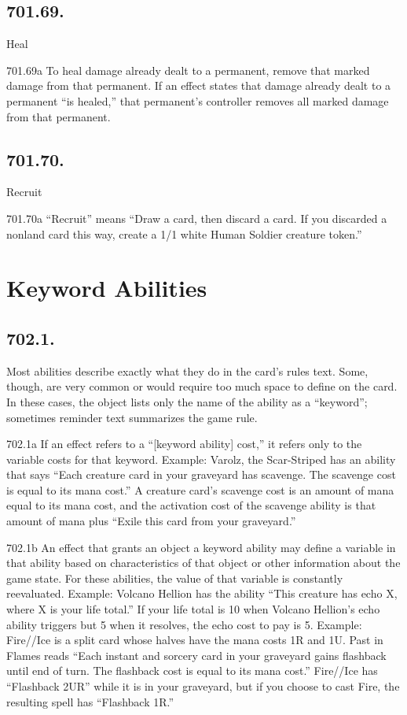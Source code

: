 \subsection*{701.69.}
Heal

701.69a To heal damage already dealt to a permanent, remove that marked damage from that permanent. If an effect states that damage already dealt to a permanent “is healed,” that permanent’s controller removes all marked damage from that permanent.

\subsection*{701.70.}
Recruit

701.70a “Recruit” means “Draw a card, then discard a card. If you discarded a nonland card this way, create a 1/1 white Human Soldier creature token.”

\section{Keyword Abilities}
\subsection*{702.1.}
Most abilities describe exactly what they do in the card’s rules text. Some, though, are very common or would require too much space to define on the card. In these cases, the object lists only the name of the ability as a “keyword”; sometimes reminder text summarizes the game rule.

702.1a If an effect refers to a “[keyword ability] cost,” it refers only to the variable costs for that keyword.
Example: Varolz, the Scar-Striped has an ability that says “Each creature card in your graveyard has scavenge. The scavenge cost is equal to its mana cost.” A creature card’s scavenge cost is an amount of mana equal to its mana cost, and the activation cost of the scavenge ability is that amount of mana plus “Exile this card from your graveyard.”

702.1b An effect that grants an object a keyword ability may define a variable in that ability based on characteristics of that object or other information about the game state. For these abilities, the value of that variable is constantly reevaluated.
Example: Volcano Hellion has the ability “This creature has echo {X}, where X is your life total.” If your life total is 10 when Volcano Hellion’s echo ability triggers but 5 when it resolves, the echo cost to pay is {5}.
Example: Fire//Ice is a split card whose halves have the mana costs {1}{R} and {1}{U}. Past in Flames reads “Each instant and sorcery card in your graveyard gains flashback until end of turn. The flashback cost is equal to its mana cost.” Fire//Ice has “Flashback {2}{U}{R}” while it is in your graveyard, but if you choose to cast Fire, the resulting spell has “Flashback {1}{R}.”

